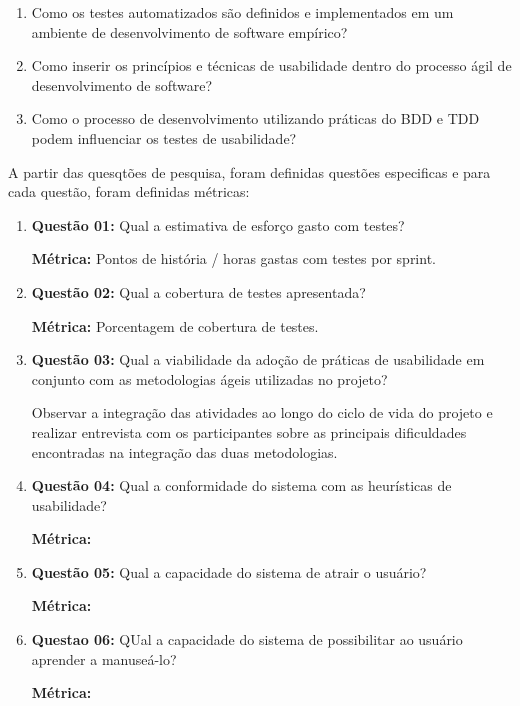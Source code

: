 \begin{enumerate}
\item Como os testes automatizados são definidos e implementados em um ambiente de desenvolvimento de software empírico?
\item Como inserir os princípios e técnicas de usabilidade dentro do processo ágil de desenvolvimento de software?
\item Como o processo de desenvolvimento utilizando práticas do BDD e TDD podem influenciar os testes de usabilidade?
\end{enumerate}

A partir das quesqtões de pesquisa, foram definidas questões especificas e para cada questão, foram definidas métricas:



\begin{enumerate}
\item \textbf{Questão 01: }Qual a estimativa de esforço gasto com testes?

	\textbf{Métrica: } Pontos de história / horas gastas com testes por sprint.

\item \textbf{Questão 02: }Qual a cobertura de testes apresentada?

	\textbf{Métrica: } Porcentagem de cobertura de testes.

\item \textbf{Questão 03: }Qual a viabilidade da adoção de práticas de usabilidade em conjunto com as metodologias ágeis utilizadas no projeto?

	Observar a integração das atividades ao longo do ciclo de vida do projeto e realizar entrevista com os participantes sobre as principais dificuldades encontradas na integração das duas metodologias.
\item \textbf{Questão 04: }Qual a conformidade do sistema com as heurísticas de usabilidade?

	\textbf{Métrica: }
\item \textbf{Questão 05: }Qual a capacidade do sistema de atrair o usuário?
	
	\textbf{Métrica: }
\item \textbf{Questao 06:} QUal a capacidade do sistema de possibilitar ao usuário aprender a manuseá-lo?

	\textbf{Métrica: }
\end{enumerate}


